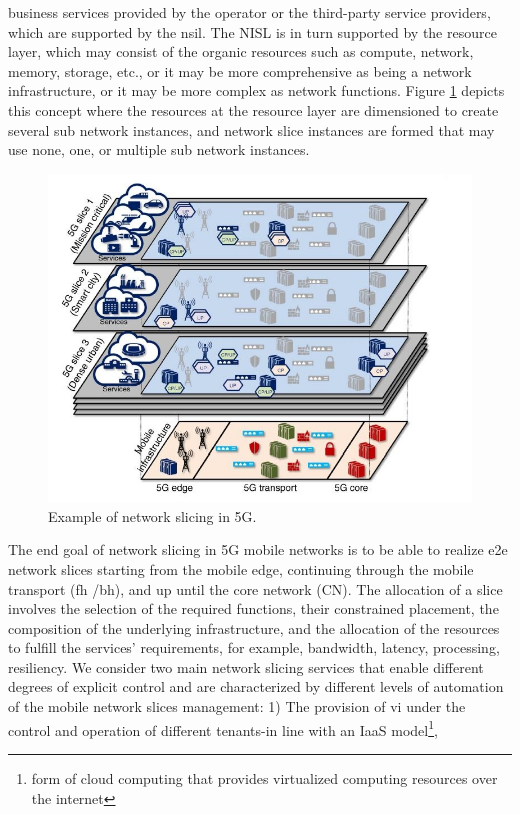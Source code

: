 \documentclass{article}
\begin{document}
business services provided by the operator or the third-party service providers,
which are supported by the \gls{nsil}. The NISL
is in turn supported by the resource layer, which may consist of the organic
resources such as compute, network, memory, storage, etc., or it may be more
comprehensive as being a network infrastructure, or it may be more complex
as network functions. Figure \ref{layers} depicts this concept where the resources at
the resource layer are dimensioned to create several sub network instances,
and network slice instances are formed that may use none, one, or multiple sub
network instances. 
\begin{figure}
\centering
\includegraphics[scale=0.5]{pics/1.JPG}
\caption{Example of network slicing in 5G.}
\label{layers}
\end{figure}
The end goal of network slicing in 5G mobile networks is to be able to realize
\gls{e2e} network slices starting from the mobile edge, continuing
through the mobile transport (\gls{fh} /\gls{bh}), and up until
the core network (CN). The allocation of a slice involves the selection of the
required functions, their constrained placement, the composition of the underlying infrastructure, and the allocation of the resources to fulfill the services' requirements, for example, bandwidth, latency, processing, resiliency.
We consider two main network slicing services that enable different degrees
of explicit control and are characterized by different levels of automation of the
mobile network slices management:
1) The provision of \gls{vi} under the control and operation
of different tenants-in line with an \gls{IaaS} model\footnote{form of cloud computing that provides virtualized computing resources over the internet},
\end{document}
